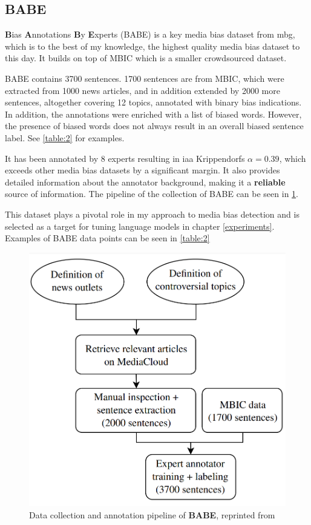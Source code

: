 \subsection{BABE}
\textbf{B}ias \textbf{A}nnotations \textbf{B}y \textbf{E}xperts (BABE) is a key media bias dataset from \Gls{mbg}, which is to the best of my knowledge, the highest quality media bias dataset to this day. It builds on top of MBIC \cite{Spinde2021MBIC} which is a smaller crowdsourced dataset.

BABE contains 3700 sentences. 1700 sentences are from MBIC, which were extracted from 1000 news articles, and in addition extended by 2000 more sentences, altogether covering 12 topics, annotated with binary bias indications. In addition, the annotations were enriched with a list of biased words. However, the presence of biased words does not always result in an overall biased sentence label. See \ref{table:2} for examples.

It has been annotated by 8 experts resulting in \gls{iaa} Krippendorfs $\alpha = 0.39$, which exceeds other media bias datasets by a significant margin. It also provides detailed information about the annotator background, making it a \textbf{reliable} source of information. The pipeline of the collection of BABE can be seen in \ref{fig:babe-data}.

This dataset plays a pivotal role in my approach to media bias detection and is selected as a target for tuning language models in chapter \ref{experiments}. Examples of BABE data points can be seen in 
\ref{table:2}




\begin{figure}
  \includegraphics[scale=0.3]{my_modules/multimedia/babe_workflow.png}
  \caption{Data collection and annotation pipeline of \textbf{BABE}, reprinted from \cite{Spinde2021f}}
  \label{fig:babe-data}
\end{figure}



